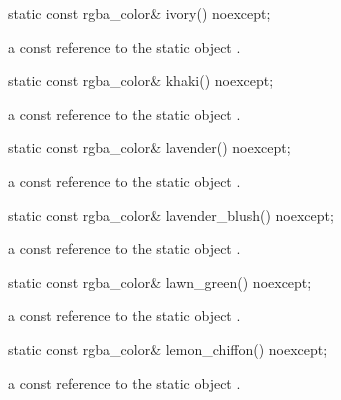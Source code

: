 \begin{itemdecl}
static const rgba_color& ivory() noexcept;
\end{itemdecl}
\begin{itemdescr}
\pnum
\returns
a const reference to the static  object .
\end{itemdescr}

\begin{itemdecl}
static const rgba_color& khaki() noexcept;
\end{itemdecl}
\begin{itemdescr}
\pnum
\returns
a const reference to the static  object .
\end{itemdescr}

\begin{itemdecl}
static const rgba_color& lavender() noexcept;
\end{itemdecl}
\begin{itemdescr}
\pnum
\returns
a const reference to the static  object .
\end{itemdescr}

\begin{itemdecl}
static const rgba_color& lavender_blush() noexcept;
\end{itemdecl}
\begin{itemdescr}
\pnum
\returns
a const reference to the static  object .
\end{itemdescr}

\begin{itemdecl}
static const rgba_color& lawn_green() noexcept;
\end{itemdecl}
\begin{itemdescr}
\pnum
\returns
a const reference to the static  object .
\end{itemdescr}

\begin{itemdecl}
static const rgba_color& lemon_chiffon() noexcept;
\end{itemdecl}
\begin{itemdescr}
\pnum
\returns
a const reference to the static  object .
\end{itemdescr}

